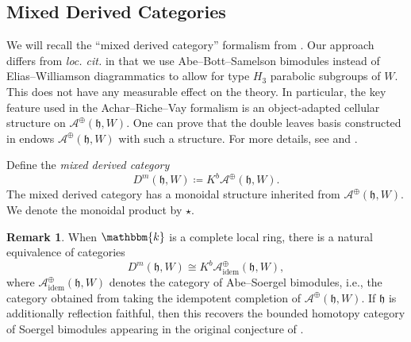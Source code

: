 \documentclass{amsart}
\renewcommand{\k}{\mathbbm{k}}
\newcommand{\scrA}{\mathcal{A}}
\newcommand{\BE}{D^m}
\newcommand{\fr}[1]{\mathfrak{#1}}
\DeclareMathOperator{\idem}{idem}
\theoremstyle{definition}
\newtheorem{remark}{Remark}[section]
\begin{document}
        \subsection{Mixed Derived Categories}

        We will recall the ``mixed derived category'' formalism from \cite{ARV}. Our approach differs from \emph{loc. cit.} in that we use Abe--Bott--Samelson bimodules instead of Elias--Williamson diagrammatics to allow for type $H_3$ parabolic subgroups of $W$.
        This does not have any measurable effect on the theory. In particular, the key feature used in the Achar--Riche--Vay formalism is an object-adapted cellular structure on $\scrA^{\oplus} (\fr{h}, W)$.
        One can prove that the double leaves basis constructed in \cite{Abe19} endows $\scrA^{\oplus} (\fr{h}, W)$ with such a structure. 
        For more details, see \cite[\S4.7]{Sandvik} and \cite[Appendix B]{Sandvik}.

        Define the \emph{mixed derived category}
        \[\BE (\fr{h}, W) \coloneq K^b \scrA^{\oplus} (\fr{h}, W).\]
        The mixed derived category has a monoidal structure inherited from $\scrA^{\oplus} (\fr{h}, W)$. We denote the monoidal product by $\star$.

        \begin{remark}
                When $\k$ is a complete local ring, there is a natural equivalence of categories
                \[\BE (\fr{h}, W) \cong K^b \scrA_{\idem}^{\oplus} (\fr{h}, W),\]
                where $\scrA_{\idem}^{\oplus} (\fr{h}, W)$ denotes the category of Abe--Soergel bimodules, i.e., the category obtained from taking the idempotent completion of $\scrA^{\oplus} (\fr{h}, W)$.
                If $\fr{h}$ is additionally reflection faithful, then this recovers the bounded homotopy category of Soergel bimodules appearing in the original conjecture of \cite{GHMN}. 
        \end{remark}
\end{document}
